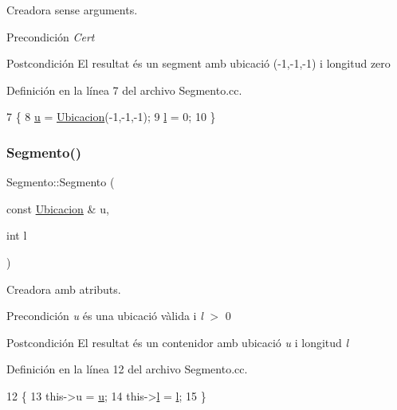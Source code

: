 Creadora sense arguments. 

\begin{DoxyPrecond}{Precondición}
{\itshape Cert} 
\end{DoxyPrecond}
\begin{DoxyPostcond}{Postcondición}
El resultat és un segment amb ubicació (-\/1,-\/1,-\/1) i longitud zero 
\end{DoxyPostcond}


Definición en la línea 7 del archivo Segmento.\+cc.


\begin{DoxyCode}
7                    \{
8   \hyperlink{class_segmento_a7fab9490df9b1b655bb88c2deb6e72ef}{u} = \hyperlink{class_ubicacion}{Ubicacion}(-1,-1,-1);
9   \hyperlink{class_segmento_a8b59abc9de156b52370dd759beab031d}{l} = 0;
10 \}
\end{DoxyCode}
\mbox{\label{class_segmento_a325e58fb03daa6d14ceeb3c4759b042d}} 
\subsubsection{\texorpdfstring{Segmento()}{Segmento()}\hspace{0.1cm}{\footnotesize\ttfamily [2/3]}}
{\footnotesize\ttfamily Segmento\+::\+Segmento (\begin{DoxyParamCaption}\item[{const \hyperlink{class_ubicacion}{Ubicacion} \&}]{u,  }\item[{int}]{l }\end{DoxyParamCaption})}



Creadora amb atributs. 

\begin{DoxyPrecond}{Precondición}
{\itshape u} és una ubicació vàlida i {\itshape l} $>$ 0 
\end{DoxyPrecond}
\begin{DoxyPostcond}{Postcondición}
El resultat és un contenidor amb ubicació {\itshape u} i longitud {\itshape l} 
\end{DoxyPostcond}


Definición en la línea 12 del archivo Segmento.\+cc.


\begin{DoxyCode}
12                                             \{
13   this->u = \hyperlink{class_segmento_a7fab9490df9b1b655bb88c2deb6e72ef}{u};
14   this->\hyperlink{class_segmento_a8b59abc9de156b52370dd759beab031d}{l} = \hyperlink{class_segmento_a8b59abc9de156b52370dd759beab031d}{l};
15 \}
\end{DoxyCode}
\mbox{\label{class_segmento_a18576aa0c0d5d4200e23b84d760b5aa3}} 
